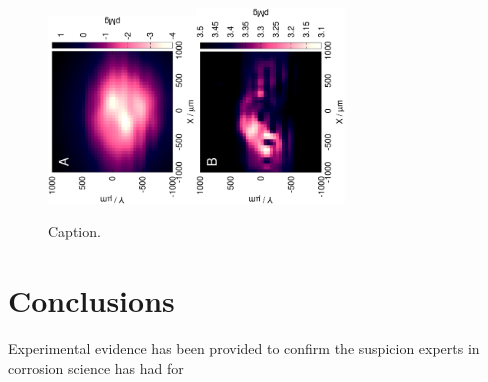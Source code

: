 \documentclass[3p]{elsarticle}
\begin{document}
\def\s{0.35}
\begin{figure}
\centering
\includegraphics[trim = 10mm 20mm 0mm 10mm, clip, width=\s\textwidth, angle=-90]{17012501.eps}\includegraphics[trim = 10mm 20mm 0mm 10mm, clip, width=\s\textwidth, angle=-90]{17012503_deconvoluted.eps}
\caption{Caption.}
\label{fig:label1}
\end{figure}





\section{Conclusions}

Experimental evidence has been provided to confirm the suspicion experts in corrosion science has had for 
\end{document}
